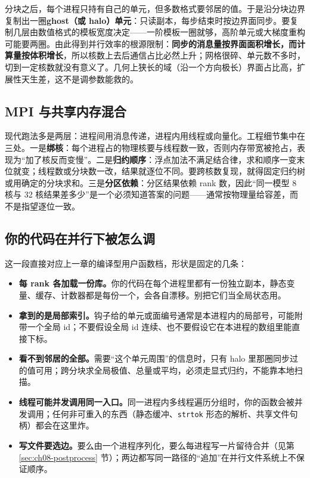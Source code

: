 \documentclass[12pt,a4paper,fontset=fandol]{ctexbook}
\begin{document}
分块之后，每个进程只持有自己的单元，但多数格式要邻居的值。于是沿分块边界复制出一圈\textbf{ghost（或 halo）单元}：只读副本，每步结束时按边界面同步。要复制几层由数值格式的模板宽度决定——一阶模板一圈就够，高阶单元或大梯度重构可能要两圈。由此得到并行效率的根源限制：\textbf{同步的消息量按界面面积增长，而计算量按体积增长}，所以核数上去后通信占比必然上升；网格很碎、单元数不多时，切到一定核数就没有意义了。几何上狭长的域（沿一个方向极长）界面占比高，扩展性天生差，这不是调参数能救的。

\subsection*{MPI 与共享内存混合}

现代跑法多是两层：进程间用消息传递，进程内用线程或向量化。工程细节集中在三处。一是\textbf{绑核}：每个进程占的物理核要与线程数一致，否则内存带宽被抢占，表现为``加了核反而变慢''。二是\textbf{归约顺序}：浮点加法不满足结合律，求和顺序一变末位就变；线程数或分块数一改，结果就逐位不同。要跨核数复现，就得固定归约树或用确定的分块求和。三是\textbf{分区依赖}：分区结果依赖 rank 数，因此``同一模型 8 核与 32 核结果差多少''是一个必须知道答案的问题——通常按物理量给容差，而不是指望逐位一致。

\subsection*{你的代码在并行下被怎么调}

这一段直接对应上一章的编译型用户函数档，形状是固定的几条：

\begin{itemize}
\item \textbf{每 rank 各加载一份库。}你的代码在每个进程里都有一份独立副本，静态变量、缓存、计数器都是每份一个，会各自漂移。别把它们当全局状态用。
\item \textbf{拿到的是局部索引。}钩子给的单元或面编号通常是本进程内的局部号，可能附带一个全局 id；不要假设全局 id 连续、也不要假设它在本进程的数组里能直接下标。
\item \textbf{看不到邻居的全部。}需要``这个单元周围''的信息时，只有 halo 里那圈同步过的值可用；跨分块求全局极值、总量或平均，必须走显式归约，不能靠本地扫描。
\item \textbf{线程可能并发调用同一入口。}同一进程内多线程遍历分组时，你的函数会被并发调用；任何非可重入的东西（静态缓冲、\texttt{strtok} 形态的解析、共享文件句柄）都会在这里炸。
\item \textbf{写文件要选边。}要么由一个进程序列化，要么每进程写一片留待合并（见第 \ref{sec:ch08-postprocess} 节）；两边都写同一路径的``追加''在并行文件系统上不保证顺序。
\end{itemize}
\end{document}
